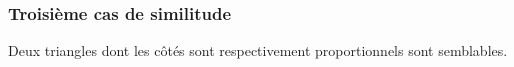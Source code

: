 \documentclass[a4paper,12pt]{article}
\begin{document}
\pagebreak
\subsubsection{Troisième cas de similitude}
\begin{theorem}
Deux triangles dont les côtés sont respectivement proportionnels sont semblables.
\end{theorem}
\end{document}
